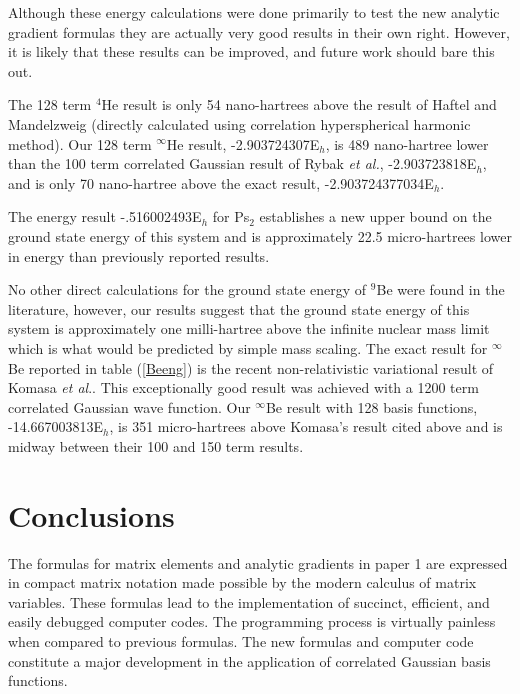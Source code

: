 \documentclass[12pt,thmsa]{article}
\begin{document}
Although these energy calculations were done primarily to test the new
analytic gradient formulas they are actually very good results in their own
right. However, it is likely that these results can be improved, and future
work should bare this out.

The 128 term $^4$He result is only 54 nano-hartrees above the result of
Haftel and Mandelzweig\cite{Haftel94} (directly calculated using correlation
hyperspherical harmonic method). Our 128 term $^\infty $He result,
-2.903724307E$_h$, is 489 nano-hartree lower than the 100 term correlated
Gaussian result of Rybak \textit{et al.}\cite{Rybak89}, -2.903723818E$_h$,
and is only 70 nano-hartree above the exact result, -2.903724377034E$_h$\cite
{Baker90,Drake88,Thakkar94}.

The energy result -.516002493E$_h$ for Ps$_2$ establishes a new upper bound
on the ground state energy of this system and is approximately 22.5
micro-hartrees lower in energy than previously reported results\cite
{Kozlowski93b,Kinghorn93,Varga96}.

No other direct calculations for the ground state energy of $^9$Be were
found in the literature, however, our results suggest that the ground state
energy of this system is approximately one milli-hartree above the infinite
nuclear mass limit which is what would be predicted by simple mass scaling.
The exact result for $^\infty $Be reported in table (\ref{Beeng}) is the
recent non-relativistic variational result of Komasa \textit{et al}.\cite
{Komasa95}. This exceptionally good result was achieved with a 1200 term
correlated Gaussian wave function. Our $^\infty $Be result with 128 basis
functions, -14.667003813E$_h$, is 351 micro-hartrees above Komasa's result
cited above and is midway between their 100 and 150 term results.

\section{Conclusions}

The formulas for matrix elements and analytic gradients in paper 1 are
expressed in compact matrix notation made possible by the modern calculus of
matrix variables. These formulas lead to the implementation of succinct,
efficient, and easily debugged computer codes. The programming process is
virtually painless when compared to previous formulas. The new formulas and
computer code constitute a major development in the application of
correlated Gaussian basis functions.
\end{document}

